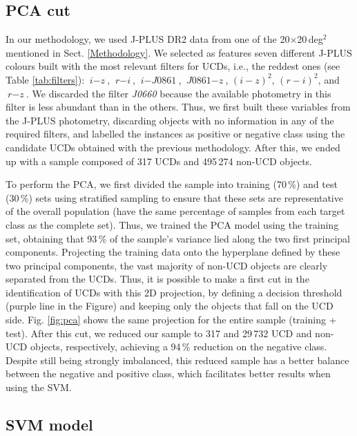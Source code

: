 \subsection{PCA cut} \label{pca_cut}

In our methodology, we used J-PLUS DR2 data from one of the 20$\times$20\,deg$^2$ mentioned in Sect. \ref{Methodology}. We selected as features seven different J-PLUS colours built with the most relevant filters for UCDs, i.e., the reddest ones (see Table \ref{tab:filters}): $\textit{i}-\textit{z}$, $\textit{r}-\textit{i}$, $\textit{i}-\textit{J0861}$, $\textit{J0861}-\textit{z}$, $(\textit{i}-\textit{z})^2$, $(\textit{r}-\textit{i})^2$, and $\textit{r}-\textit{z}$. We discarded the filter \textit{J0660} because the available photometry in this filter is less abundant than in the others. Thus, we first built these variables from the J-PLUS photometry, discarding objects with no information in any of the required filters, and labelled the instances as positive or negative class using the candidate UCDs obtained with the previous methodology. After this, we ended up with a sample composed of 317 UCDs and 495\,274 non-UCD objects.

To perform the PCA, we first divided the sample into training (70\,\%) and test (30\,\%) sets using stratified sampling to ensure that these sets are representative of the overall population (have the same percentage of samples from each target class as the complete set). Thus, we trained the PCA model using the training set, obtaining that 93\,\% of the sample's variance lied along the two first principal components. Projecting the training data onto the hyperplane defined by these two principal components, the vast majority of non-UCD objects are clearly separated from the UCDs. Thus, it is possible to make a first cut in the identification of UCDs with this 2D projection, by defining a decision threshold (purple line in the Figure) and keeping only the objects that fall on the UCD side. Fig. \ref{fig:pca} shows the same projection for the entire sample (training + test). After this cut, we reduced our sample to 317 and 29\,732 UCD and non-UCD objects, respectively, achieving a 94\,\% reduction on the negative class. Despite still being strongly imbalanced, this reduced sample has a better balance between the negative and positive class, which facilitates better results when using the SVM.


\subsection{SVM model} \label{svm}

